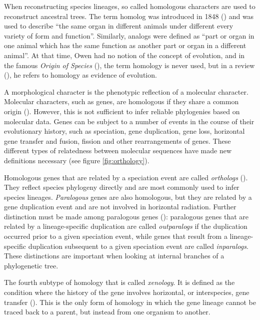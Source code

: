 When reconstructing species lineages, so called homologous characters are used
to reconstruct ancestral trees. The term homolog was introduced in 1848
(\cite{owen1848}) and was used to describe ``the same organ in different animals
under different every variety of form and function''. Similarly, analogs were
defined as ``part or organ in one animal which has the same function as another
part or organ in a different animal''. At that time, Owen had no notion of the
concept of evolution, and in the famous \emph{Origin of Species}
(\cite{darwin1859}), the term homology is never used, but in a review
(\cite{owen1860}), he refers to homology as evidence of evolution.

A morphological character is the phenotypic reflection of a molecular character.
Molecular characters, such as genes, are homologous if they share a common
origin (\cite{koonin2005}). However, this is not sufficient to infer reliable
phylogenies based on molecular data. Genes can be subject to a number of events
in the course of their evolutionary history, such as speciation, gene
duplication, gene loss, horizontal gene transfer and fusion, fission and other
rearrangements of genes. These different types of relatedness between molecular
sequences have made new definitions necessary (see figure \ref{fig:orthology}).



Homologous genes that are related by a speciation event are called
\emph{orthologs} (\cite{fitch1970}). They reflect species phylogeny directly and
are most commonly used to infer species lineages. \emph{Paralogous} genes are
also homologous, but they are related by a gene duplication event and are not
involved in horizontal radiation. Further distinction must be made among
paralogous genes (\cite{sonnhammer2002}): paralogous genes that are related by a
lineage-specific duplication are called \emph{outparalogs} if the duplication
occurred prior to a given speciation event, while genes that result from a
lineage-specific duplication subsequent to a given speciation event are called
\emph{inparalogs}.  These distinctions are important when looking at internal
branches of a phylogenetic tree.

The fourth subtype of homology that is called \emph{xenology}. It is defined as
the condition where the history of the gene involves horizontal, or
interspecies, gene transfer (\cite{gray1983}). This is the only form of homology
in which the gene lineage cannot be traced back to a parent, but instead from
one organism to another.

